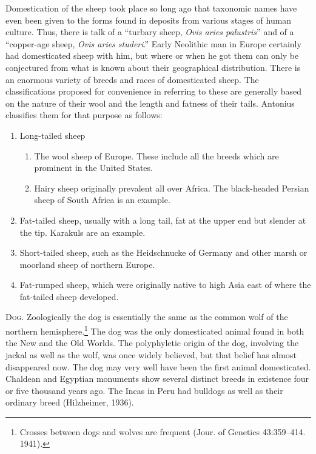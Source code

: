 Domestication of the sheep took place so long ago that taxonomic names have even been given to the forms found in 
deposits from various stages of human culture. Thus, there is talk of a ``turbary sheep, 
\textit{Ovis aries palustris}'' and of a ``copper-age sheep, \textit{Ovis aries studeri}.'' Early Neolithic man in Europe 
certainly had domesticated sheep with him, but where or when he got them can only be conjectured from what is known
about their geographical distribution. There is an enormous variety of breeds and races of domesticated sheep. The 
classifications proposed for convenience in referring to these are generally based on the nature of their wool and the 
length and fatness of their tails. Antonius classifies them for that purpose as follows:
\begin{enumerate}
	\item[1.] Long-tailed sheep
	\begin{enumerate}
		\item[A.] The wool sheep of Europe. These include all the breeds which are prominent in the United States.
		\item[B.] Hairy sheep originally prevalent all over Africa. The black-headed Persian sheep of South Africa is an example.
	\end{enumerate}
	\item[2.] Fat-tailed sheep, usually with a long tail, fat at the upper end but slender at the tip. Karakuls are an example.
	\item[3.] Short-tailed sheep, such as the Heidschnucke of Germany and other marsh or moorland sheep of northern Europe. 
	\item[4.] Fat-rumped sheep, which were originally native to high Asia east of where the fat-tailed sheep developed.
\end{enumerate}

\textsc{Dog}. Zoologically the dog is essentially the same as the common wolf of the northern hemisphere.\footnote{Crosses
between dogs and wolves are frequent (Jour. of Genetics 43:359--414. 1941).} The dog was the only 
domesticated animal found in both the New and the Old Worlds. The polyphyletic origin of the dog, involving the jackal
as well as the wolf, was once widely believed, but that belief has almost disappeared now. The dog may very well have 
been the first animal domesticated. Chaldean and Egyptian monuments show several distinct breeds in existence four or 
five thousand years ago. The Incas in Peru had bulldogs as well as their ordinary breed (Hilzheimer, 1936).

